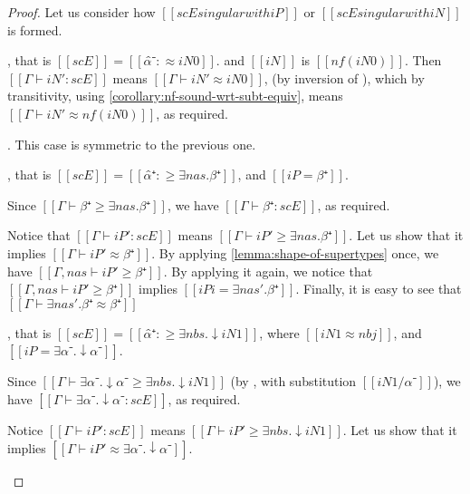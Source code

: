 \lemEntrySingularitySoundness*
\begin{proof}
    Let us consider how $[[scE singular with iP]]$ or $[[scE singular with iN]]$ is formed.
    \begin{caseof}
        \item {}, that is $[[scE]] = [[α̂⁻ :≈ iN0]]$.
            and $[[iN]]$ is $[[nf(iN0)]]$.
            Then $[[Γ ⊢ iN' : scE]]$ means $[[Γ ⊢ iN' ≈ iN0]]$, 
            (by inversion of ),
            which by transitivity, using \cref{corollary:nf-sound-wrt-subt-equiv},
            means $[[Γ ⊢ iN' ≈ nf(iN0)]]$, 
            as required.
        \item {}. This case is symmetric to the previous one.

        \item {}, that is 
            $[[scE]] = [[α̂⁺ :≥ ∃nas.β⁺]]$, and $[[iP = β⁺]]$.

            Since $[[Γ ⊢ β⁺ ≥  ∃nas.β⁺]]$, we have $[[Γ ⊢ β⁺ : scE ]]$, 
            as required.

            Notice that $[[Γ ⊢ iP' : scE]]$ means $[[Γ ⊢ iP' ≥ ∃nas.β⁺]]$.
            Let us show that it implies $[[Γ ⊢ iP' ≈ β⁺]]$.
            By applying \cref{lemma:shape-of-supertypes} once, 
            we have $[[Γ, nas ⊢ iP' ≥ β⁺]]$.
            By applying it again, we notice that
            $[[Γ, nas ⊢ iP' ≥ β⁺]]$ implies $[[iPi = ∃nas'.β⁺]]$.
            Finally, it is easy to see that $[[Γ ⊢ ∃nas'.β⁺ ≈ β⁺]]$

        \item {},
            that is $[[scE]] = [[α̂⁺ :≥ ∃nbs.↓iN1]]$, 
            where $[[iN1 ≈ nbj]]$, and $[[iP = ∃α⁻.↓α⁻]]$.

            Since $[[Γ ⊢ ∃α⁻.↓α⁻ ≥ ∃nbs.↓iN1]]$ 
            (by , with substitution $[[iN1 / α⁻]]$),
            we have $[[Γ ⊢ ∃α⁻.↓α⁻ : scE ]]$, as required.

            Notice $[[Γ ⊢ iP' : scE]]$ means $[[Γ ⊢ iP' ≥ ∃nbs.↓iN1]]$.
            Let us show that it implies $[[Γ ⊢ iP' ≈ ∃α⁻.↓α⁻]]$.


\end{caseof}
\end{proof}
